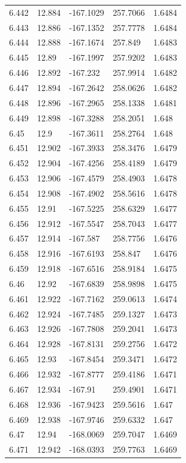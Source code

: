 \begin{tabular}{lllll}
6.442 & 12.884 & -167.1029 & 257.7066 & 1.6484 \\
6.443 & 12.886 & -167.1352 & 257.7778 & 1.6484 \\
6.444 & 12.888 & -167.1674 & 257.849 & 1.6483 \\
6.445 & 12.89 & -167.1997 & 257.9202 & 1.6483 \\
6.446 & 12.892 & -167.232 & 257.9914 & 1.6482 \\
6.447 & 12.894 & -167.2642 & 258.0626 & 1.6482 \\
6.448 & 12.896 & -167.2965 & 258.1338 & 1.6481 \\
6.449 & 12.898 & -167.3288 & 258.2051 & 1.648 \\
6.45 & 12.9 & -167.3611 & 258.2764 & 1.648 \\
6.451 & 12.902 & -167.3933 & 258.3476 & 1.6479 \\
6.452 & 12.904 & -167.4256 & 258.4189 & 1.6479 \\
6.453 & 12.906 & -167.4579 & 258.4903 & 1.6478 \\
6.454 & 12.908 & -167.4902 & 258.5616 & 1.6478 \\
6.455 & 12.91 & -167.5225 & 258.6329 & 1.6477 \\
6.456 & 12.912 & -167.5547 & 258.7043 & 1.6477 \\
6.457 & 12.914 & -167.587 & 258.7756 & 1.6476 \\
6.458 & 12.916 & -167.6193 & 258.847 & 1.6476 \\
6.459 & 12.918 & -167.6516 & 258.9184 & 1.6475 \\
6.46 & 12.92 & -167.6839 & 258.9898 & 1.6475 \\
6.461 & 12.922 & -167.7162 & 259.0613 & 1.6474 \\
6.462 & 12.924 & -167.7485 & 259.1327 & 1.6473 \\
6.463 & 12.926 & -167.7808 & 259.2041 & 1.6473 \\
6.464 & 12.928 & -167.8131 & 259.2756 & 1.6472 \\
6.465 & 12.93 & -167.8454 & 259.3471 & 1.6472 \\
6.466 & 12.932 & -167.8777 & 259.4186 & 1.6471 \\
6.467 & 12.934 & -167.91 & 259.4901 & 1.6471 \\
6.468 & 12.936 & -167.9423 & 259.5616 & 1.647 \\
6.469 & 12.938 & -167.9746 & 259.6332 & 1.647 \\
6.47 & 12.94 & -168.0069 & 259.7047 & 1.6469 \\
6.471 & 12.942 & -168.0393 & 259.7763 & 1.6469 \\

\end{tabular}
